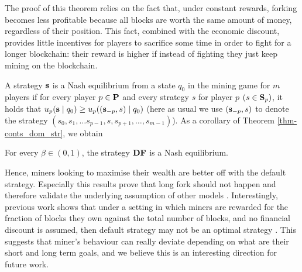 The proof of this theorem relies on the fact that, under constant rewards, forking becomes less profitable because all blocks are worth the same amount of money, regardless of their position. This fact, combined with the economic discount, provides little incentives for players to sacrifice some time in order to fight for a longer blockchain: their reward is higher if instead of fighting they just keep mining on the blockchain. 

A strategy $\mathbf{s}$ is a Nash equilibrium from a state $q_0$ in the %
mining game for $m$ players if for every player $p \in \mathbf{P}$ and every strategy $s$ for player $p$ $(s \in\mathbf{S}_p)$, it holds that $u_p(\mathbf{s} \mid q_0)  \geq  u_p ((\mathbf{s}_{-p},s) \mid q_0)$ (here 
as usual we use $(\mathbf{s}_{-p}, s)$ to denote the strategy $(s_0, s_1, \ldots s_{p-1},s,s_{p+1}, \ldots, s_{m-1})$). As a corollary of Theorem \ref{thm-conts_dom_str}, we obtain
\begin{corollary}\label{cor-conts_equlibria}
For every $\beta \in (0,1)$, the strategy $\text{\rm {\bf DF}}$ is a Nash equilibrium.
\end{corollary} 

Hence, miners looking to maximise their %
wealth are better off with the default strategy. 
Especially this results prove that long fork should not happen and therefore validate the underlying assumption of other models \cite{mininggames:2016}. 
Interestingly,  previous work shows that under a setting in which 
miners are rewarded for the fraction of blocks they own against the total number of blocks, and no financial discount is assumed, then default strategy may not be an optimal strategy  \cite{mininggames:2016}.
This suggests that miner's behaviour can really deviate depending on what are their short and long term goals, and we believe this is an interesting direction for future work. 

